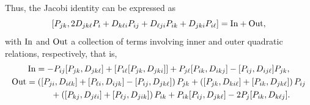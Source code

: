 \documentclass[pdftex]{sigma}
\numberwithin{equation}{section}
\begin{document}
Thus, the Jacobi identity can be expressed as
\[ [P_{jk}, 2D_{jk\ell}P_i + D_{k\ell i}P_{ij}+ D_{ \ell ji}P_{ik}+D_{jki}P_{i\ell}] = {\rm In} +{\rm Out}, \]
with $\rm In$ and ${\rm Out}$ a collection of terms involving inner and outer quadratic relations, respectively, that is,
 \begin{gather*}
{\rm In}= - P_{ij}[P_{jk}, D_{jk\ell}]+ [P_{i \ell}[P_{jk}, D_{jki}]]+P_{j\ell} [P_{ik}, D_{ikj}]-[P_{ij}, D_{ij\ell}] P_{jk}, \\
   {\rm Out}= \left( [P_{ji}, D_{i\ell k}]+[ P_{\ell i}, D_{i jk}] -[P_{ij}, D_{jk\ell}]\right) P_{jk}
    +\left([P_{jk}, D_{ki\ell}] +[P_{ik}, D_{jk\ell}]\right)P_{ij}\\
   \phantom{ Out= }{}  + \left( [P_{kj}, D_{j\ell i}]+[P_{\ell j}, D_{jik}]\right)P_{ik}+ P_{ik}[ P_{ij}, D_{jk\ell}] -2P_j [ P_{ik}, D_{k\ell j}].
    \end{gather*}
\end{document}
